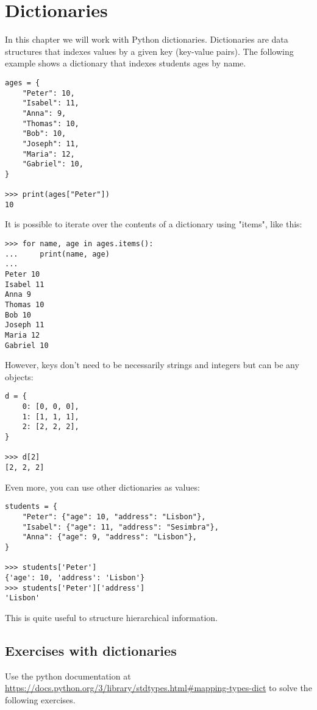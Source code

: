 \chapter{Dictionaries}\label{dictionaries}

In this chapter we will work with Python dictionaries. Dictionaries are data structures that indexes values by a given key (key-value pairs). The following example shows a dictionary that indexes students ages by name.

\begin{lstlisting}
ages = {
    "Peter": 10,
    "Isabel": 11,
    "Anna": 9,
    "Thomas": 10,
    "Bob": 10,
    "Joseph": 11,
    "Maria": 12,
    "Gabriel": 10,
}

>>> print(ages["Peter"])
10
\end{lstlisting}

It is possible to iterate over the contents of a dictionary using "items", like this:

\begin{lstlisting}
>>> for name, age in ages.items():
...     print(name, age)
... 
Peter 10
Isabel 11
Anna 9
Thomas 10
Bob 10
Joseph 11
Maria 12
Gabriel 10
\end{lstlisting}

However, keys don't need to be necessarily strings and integers but can be any objects:

\begin{lstlisting}
d = {
    0: [0, 0, 0],
    1: [1, 1, 1],
    2: [2, 2, 2],
}

>>> d[2]
[2, 2, 2]
\end{lstlisting}

Even more, you can use other dictionaries as values:

\begin{lstlisting}
students = {
    "Peter": {"age": 10, "address": "Lisbon"},
    "Isabel": {"age": 11, "address": "Sesimbra"},
    "Anna": {"age": 9, "address": "Lisbon"},
}

>>> students['Peter']
{'age': 10, 'address': 'Lisbon'}
>>> students['Peter']['address']
'Lisbon'
\end{lstlisting}

This is quite useful to structure hierarchical information. 

\section{Exercises with dictionaries}

Use the python documentation at \url{https://docs.python.org/3/library/stdtypes.html#mapping-types-dict} to solve the following exercises.

